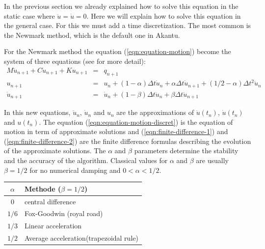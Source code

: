 \documentclass[a4paper,11pt]{book}
\begin{document}
In the previous  section we already explained how to solve  this equation in the
static case where $\ddot{u}  = \dot{u} = 0$.  Here we will  explain how to solve
this   equation  in   the  general   case.  For   this  we   must  add   a  time
discretization. The most common is the  Newmark method, which is the default one
in Akantu.

For the Newmark method  the equation (\ref{eqn:equation-motion}) become the system
of   three   equations    (see   \cite{curnier92a}
\cite{hughes-83a} for more detail):
\begin{eqnarray}
  M     \ddot{u}_{n+1}    +     C    \dot{u}_{n+1}     +    K     u_{n+1}    &=&
  q_{n+1} \label{eqn:equation-motion-discret} \\
  u_{n+1}  &=& u_{n}  + (1  - \alpha)  \Delta t  \dot{u}_{n} +  \alpha  \Delta t
  \dot{u}_{n+1}       +       (1/2        -       \alpha)       \Delta       t^2
  \ddot{u}_n \label{eqn:finite-difference-1}\\
  \dot{u}_{n+1}  &=& \dot{u}_{n} +  (1 -  \beta) \Delta  t \ddot{u}_{n}  + \beta
  \Delta t \ddot{u}_{n+1}\label{eqn:finite-difference-2}
\end{eqnarray}

In   this  new   equations,  $\ddot{u}_n$,   $\dot{u}_n$  and   $u_n$   are  the
approximations  of $\ddot{u}(t_n)$, $\dot{u}(t_n)$  and $u(t_n)$.   The equation
(\ref{eqn:equation-motion-discret})  is   the  equation  of  motion   in  term  of
approximate      solutions       and      (\ref{eqn:finite-difference-1})      and
(\ref{eqn:finite-difference-2}) are the  finite difference formulas describing the
evolution  of the  approximate solutions.  The $\alpha$  and  $\beta$ parameters
determine the stability and the  accuracy of the algorithm. Classical values for
$\alpha$ and $\beta$ are usually $\beta = 1/2$ for no numerical damping and $0 <
\alpha < 1/2$.

\begin{center}
  \begin{tabular}{c|l}
    $\alpha$ & Methode ($\beta = 1/2$)\\
    \hline
    $0$ & central difference\\
    $1/6$ & Fox-Goodwin (royal road)\\
    $1/3$ & Linear acceleration\\
    $1/2$ & Average acceleration(trapezoidal rule)
  \end{tabular}
\end{center}
\end{document}
